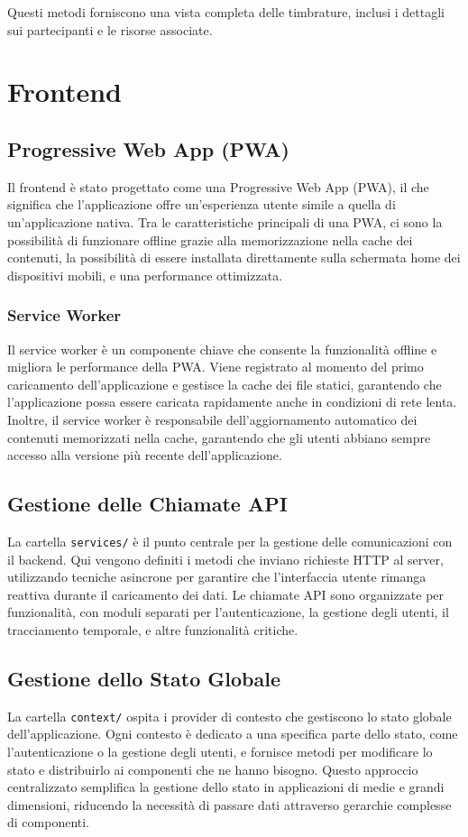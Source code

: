 \documentclass[twoside]{supsistudent}
\begin{document}
Questi metodi forniscono una vista completa delle timbrature, inclusi i dettagli sui partecipanti e le risorse associate.

\section{Frontend}

\subsection{Progressive Web App (PWA)}
Il frontend è stato progettato come una Progressive Web App (PWA), il che significa che l'applicazione offre un'esperienza utente simile a quella di un'applicazione nativa. Tra le caratteristiche principali di una PWA, ci sono la possibilità di funzionare offline grazie alla memorizzazione nella cache dei contenuti, la possibilità di essere installata direttamente sulla schermata home dei dispositivi mobili, e una performance ottimizzata.

\subsubsection{Service Worker}
Il service worker è un componente chiave che consente la funzionalità offline e migliora le performance della PWA. Viene registrato al momento del primo caricamento dell'applicazione e gestisce la cache dei file statici, garantendo che l'applicazione possa essere caricata rapidamente anche in condizioni di rete lenta. Inoltre, il service worker è responsabile dell'aggiornamento automatico dei contenuti memorizzati nella cache, garantendo che gli utenti abbiano sempre accesso alla versione più recente dell'applicazione.


\subsection{Gestione delle Chiamate API}
La cartella \texttt{services/} è il punto centrale per la gestione delle comunicazioni con il backend. Qui vengono definiti i metodi che inviano richieste HTTP al server, utilizzando tecniche asincrone per garantire che l'interfaccia utente rimanga reattiva durante il caricamento dei dati. Le chiamate API sono organizzate per funzionalità, con moduli separati per l'autenticazione, la gestione degli utenti, il tracciamento temporale, e altre funzionalità critiche.

\subsection{Gestione dello Stato Globale}
La cartella \texttt{context/} ospita i provider di contesto che gestiscono lo stato globale dell'applicazione. Ogni contesto è dedicato a una specifica parte dello stato, come l'autenticazione o la gestione degli utenti, e fornisce metodi per modificare lo stato e distribuirlo ai componenti che ne hanno bisogno. Questo approccio centralizzato semplifica la gestione dello stato in applicazioni di medie e grandi dimensioni, riducendo la necessità di passare dati attraverso gerarchie complesse di componenti.
\end{document}
